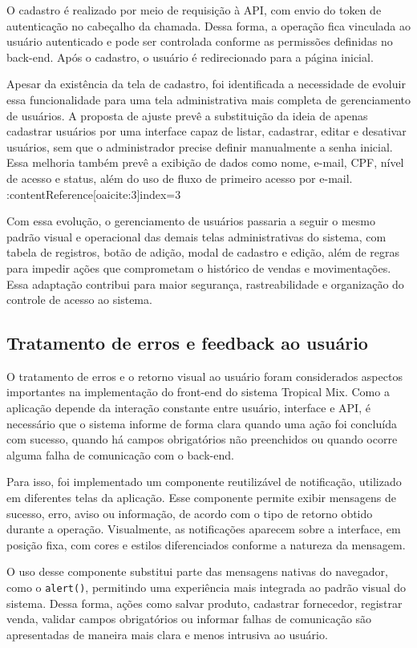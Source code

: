 O cadastro é realizado por meio de requisição à API, com envio do token de autenticação no cabeçalho da chamada. Dessa forma, a operação fica vinculada ao usuário autenticado e pode ser controlada conforme as permissões definidas no back-end. Após o cadastro, o usuário é redirecionado para a página inicial.

Apesar da existência da tela de cadastro, foi identificada a necessidade de evoluir essa funcionalidade para uma tela administrativa mais completa de gerenciamento de usuários. A proposta de ajuste prevê a substituição da ideia de apenas cadastrar usuários por uma interface capaz de listar, cadastrar, editar e desativar usuários, sem que o administrador precise definir manualmente a senha inicial. Essa melhoria também prevê a exibição de dados como nome, e-mail, CPF, nível de acesso e status, além do uso de fluxo de primeiro acesso por e-mail. :contentReference[oaicite:3]{index=3}

Com essa evolução, o gerenciamento de usuários passaria a seguir o mesmo padrão visual e operacional das demais telas administrativas do sistema, com tabela de registros, botão de adição, modal de cadastro e edição, além de regras para impedir ações que comprometam o histórico de vendas e movimentações. Essa adaptação contribui para maior segurança, rastreabilidade e organização do controle de acesso ao sistema.


\subsection{Tratamento de erros e feedback ao usuário}

O tratamento de erros e o retorno visual ao usuário foram considerados aspectos importantes na implementação do front-end do sistema Tropical Mix. Como a aplicação depende da interação constante entre usuário, interface e API, é necessário que o sistema informe de forma clara quando uma ação foi concluída com sucesso, quando há campos obrigatórios não preenchidos ou quando ocorre alguma falha de comunicação com o back-end.

Para isso, foi implementado um componente reutilizável de notificação, utilizado em diferentes telas da aplicação. Esse componente permite exibir mensagens de sucesso, erro, aviso ou informação, de acordo com o tipo de retorno obtido durante a operação. Visualmente, as notificações aparecem sobre a interface, em posição fixa, com cores e estilos diferenciados conforme a natureza da mensagem.

O uso desse componente substitui parte das mensagens nativas do navegador, como o \texttt{alert()}, permitindo uma experiência mais integrada ao padrão visual do sistema. Dessa forma, ações como salvar produto, cadastrar fornecedor, registrar venda, validar campos obrigatórios ou informar falhas de comunicação são apresentadas de maneira mais clara e menos intrusiva ao usuário.

